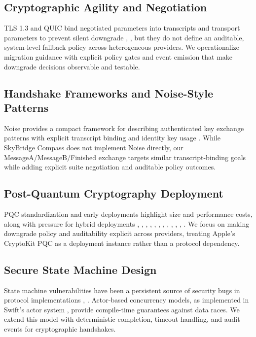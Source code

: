 \documentclass[10pt,journal,compsoc]{IEEEtran}
\begin{document}
\subsection{Cryptographic Agility and
Negotiation}\label{b.-cryptographic-agility-and-negotiation}

TLS 1.3 and QUIC bind negotiated parameters into transcripts and
transport parameters to prevent silent downgrade \cite{ref6}, \cite{ref18},
but they do not define an auditable, system-level fallback policy across
heterogeneous providers. We operationalize migration guidance
\cite{ref7,ref38} with explicit policy gates and event emission that make
downgrade decisions observable and testable.

\subsection{Handshake Frameworks and Noise-Style
Patterns}\label{c.-handshake-frameworks-and-noise-style-patterns}

Noise provides a compact framework for describing authenticated key
exchange patterns with explicit transcript binding and identity key
usage \cite{ref19}. While SkyBridge Compass does not implement Noise
directly, our MessageA/MessageB/Finished exchange targets similar
transcript-binding goals while adding explicit suite negotiation and
auditable policy outcomes.

\subsection{Post-Quantum Cryptography
Deployment}\label{d.-post-quantum-cryptography-deployment}

PQC standardization and early deployments highlight size and performance
costs, along with pressure for hybrid deployments \cite{ref8}, \cite{ref9},
\cite{ref10}, \cite{ref15}, \cite{ref40}, \cite{ref22}, \cite{ref41},
\cite{ref42}, \cite{ref17}, \cite{ref23}, \cite{ref24}, \cite{ref25}. We
focus on making downgrade policy and auditability explicit across
providers, treating Apple's CryptoKit PQC \cite{ref1,ref34} as a deployment
instance rather than a protocol dependency.

\subsection{Secure State Machine
Design}\label{e.-secure-state-machine-design}

State machine vulnerabilities have been a persistent source of security
bugs in protocol implementations \cite{ref11}, \cite{ref30}. Actor-based concurrency
models, as implemented in Swift's actor system \cite{ref12}, provide
compile-time guarantees against data races. We extend this model with
deterministic completion, timeout handling, and audit events for
cryptographic handshakes.
\end{document}
